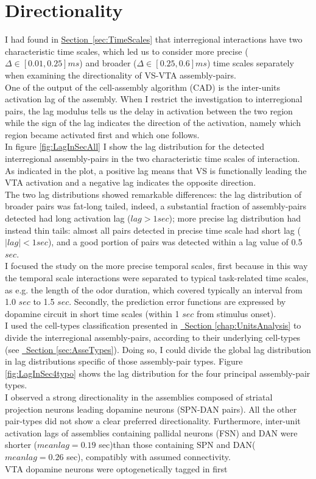 \section{Directionality} 
\label{sec:Directionality}
 I had found in \hyperref[sec:TimeScales]{Section~\ref*{sec:TimeScales}} that interregional interactions have two characteristic time scales, which led us to consider more precise ($\Delta \in [0.01,0.25] ms$) and broader ($\Delta \in [0.25,0.6] ms$) time scales separately when examining the directionality of VS-VTA assembly-pairs.\\One of the output of the cell-assembly algorithm (CAD) is the inter-units activation lag of the assembly. When I restrict the investigation to interregional pairs, the lag modulus tells us the delay in activation between the two region while the sign of the lag indicates the direction of the activation, namely which region became activated first and which one follows.\\In figure \ref{fig:LagInSecAll} I show the lag distribution for the detected interregional assembly-pairs in the two characteristic time scales of interaction. As indicated in the plot, a positive lag means that VS is functionally leading the VTA activation and a negative lag indicates the opposite direction.\\The two lag distributions showed remarkable differences: the lag distribution of broader pairs was fat-long tailed, indeed, a substantial fraction of assembly-pairs detected had long activation lag ($lag > 1 sec$); more precise lag distribution had instead thin tails: almost all pairs detected in precise time scale had short lag ($|lag| < 1 sec$), and a good portion of pairs was detected within a lag value of 0.5 $sec$.\\I focused the study on the more precise temporal scales, first because in this way the temporal scale interactions were separated to typical task-related time scales, as e.g. the length of the odor duration, which covered typically an interval from 1.0 $sec$ to 1.5 $sec$. Secondly, the prediction error functions are expressed by dopamine circuit in short time scales (within 1 $sec$ from stimulus onset).\\ I used the cell-types classification presented in \hyperref[chap:UnitsAnalysis]{~Section \ref*{chap:UnitsAnalysis}} to divide the interregional assembly-pairs, according to their underlying cell-types (see \hyperref[sec:AsseTypes]{~Section \ref*{sec:AsseTypes}}). Doing so, I could divide the global lag distribution in lag distributions specific of those assembly-pair types. Figure \ref{fig:LagInSec4typo} shows the lag distribution for the four principal assembly-pair types.\\I observed a strong directionality in the assemblies composed of striatal projection neurons leading dopamine neurons (SPN-DAN pairs). All the other pair-types did not show a clear preferred directionality. Furthermore, inter-unit activation lags of assemblies containing pallidal neurons (FSN) and DAN were shorter ($mean lag=0.19$ sec)than those containing SPN and DAN($mean lag=0.26$ sec), compatibly with assumed connectivity.\\VTA dopamine neurons were optogenetically tagged in first 